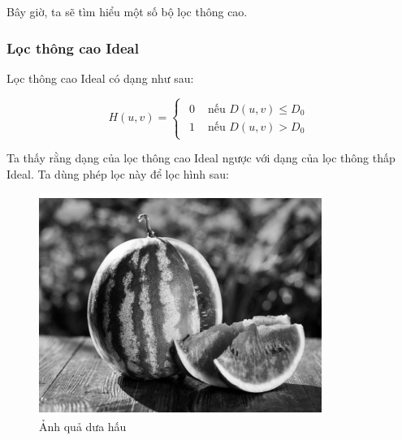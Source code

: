 \documentclass[12pt,a4paper]{report}
\numberwithin{equation}{section}
\theoremstyle{definition} %
\begin{document}
Bây giờ, ta sẽ tìm hiểu một số bộ lọc thông cao.

\subsubsection{Lọc thông cao Ideal}

Lọc thông cao Ideal có dạng như sau:

\begin{equation}
      H(u,v)=\begin{cases}
    \begin{aligned}
        0& \text{ nếu }  D(u,v) \le D_0\\
        1& \text{ nếu }  D(u,v) > D_0
    \end{aligned}
\end{cases}
\end{equation}


Ta thấy rằng dạng của lọc thông cao Ideal ngược với dạng của lọc thông thấp Ideal. Ta dùng phép lọc này để lọc hình sau: 
\begin{figure}[H]
\centering
\includegraphics[width=0.5\linewidth]{img/Duahau.png}
\caption{Ảnh quả dưa hấu}
\label{fig128}
\end{figure}
\end{document}
